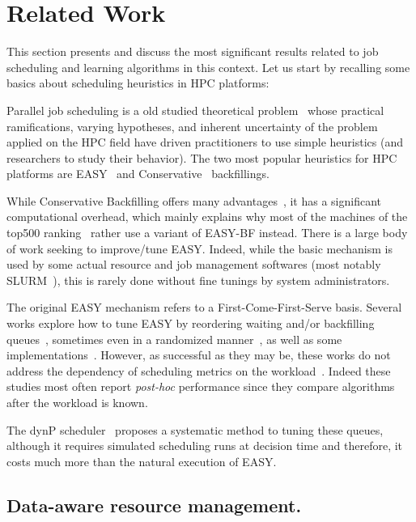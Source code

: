 \documentclass[sigconf,review]{acmart}
\begin{document}
\section{Related Work}
\label{sec:rw}

This section presents and discuss the most significant results related to job
scheduling and learning algorithms in this context.  Let us start by recalling
some basics about scheduling heuristics in HPC platforms:

Parallel job scheduling is a old studied theoretical
problem~\cite{Frachtenberg:2009:JSS:1692356,Feitelson:2004:PJS:2128864.2128865}
whose practical ramifications, varying hypotheses, and inherent uncertainty of
the problem applied on the HPC field have driven practitioners to use simple
heuristics (and researchers to study their behavior). The two most popular
heuristics for HPC platforms are EASY~\cite{easy} and
Conservative~\cite{Mu'alem:2001:UPW:380314.380315} backfillings.

While Conservative Backfilling offers many advantages~\cite{bfchar}, it has a
significant computational overhead, which mainly explains why most of the
machines of the top500 ranking~\cite{top500} rather use a variant of EASY-BF
instead.  There is a large body of work seeking to improve/tune EASY. Indeed,
while the basic mechanism is used by some actual resource and job management
softwares (most notably SLURM~\cite{SLURMdocSCHED}), this is rarely done
without fine tunings by system administrators.

The original EASY mechanism refers to a First-Come-First-Serve basis.  Several
works explore how to tune EASY by reordering waiting and/or backfilling
queues~\cite{Tsafrir_easypp_2005}, sometimes even in a randomized
manner~\cite{1592720}, as well as some implementations~\cite{Jackson2001}.
However, as successful as they may be, these works do not address the
dependency of scheduling metrics on the workload~\cite{variability}. Indeed
these studies most often report \textit{post-hoc} performance since they
compare algorithms after the workload is known.

The dynP scheduler~\cite{streit_selftuning_2002} proposes a systematic
method to tuning these queues, although it requires simulated scheduling runs
at decision time and therefore, it costs much more than the natural execution of EASY.

\subsection{Data-aware resource management.}
\end{document}
